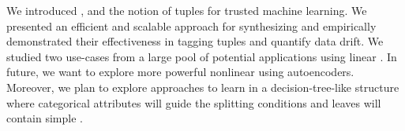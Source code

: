 We introduced \dis, and the notion of \nc tuples for trusted
machine learning. We presented an efficient and scalable approach for
synthesizing \dis and empirically demonstrated their effectiveness in tagging
\nc tuples and quantify data drift.
We studied two use-cases from a large pool of potential applications using
linear \dis. In future, we want to explore more powerful nonlinear \dis using
autoencoders. Moreover, we plan to explore approaches to learn \dis in a
decision-tree-like structure where categorical attributes will guide the
splitting conditions and leaves will contain simple \dis.



